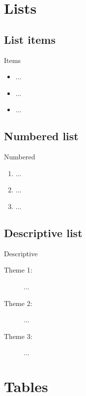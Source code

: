 \documentclass{IFES-beamer}
\begin{document}
\section{Lists}

\subsection{List items}

\begin{frame}{Items}

	\begin{itemize}
		\item ...
    \item ...
    \item ...
  \end{itemize}
  
\end{frame} 

\subsection{Numbered list}

\begin{frame}{Numbered}

	\begin{enumerate}
		\item ...
    \item ...
    \item ...
  \end{enumerate}
  
\end{frame} 

\subsection{Descriptive list} 

\begin{frame}{Descriptive} 

	\begin{description}
		\item [Theme 1:] ...
		\item [Theme 2:] ...
		\item [Theme 3:] ...
	\end{description}

\end{frame}


\section{Tables}
\end{document}

